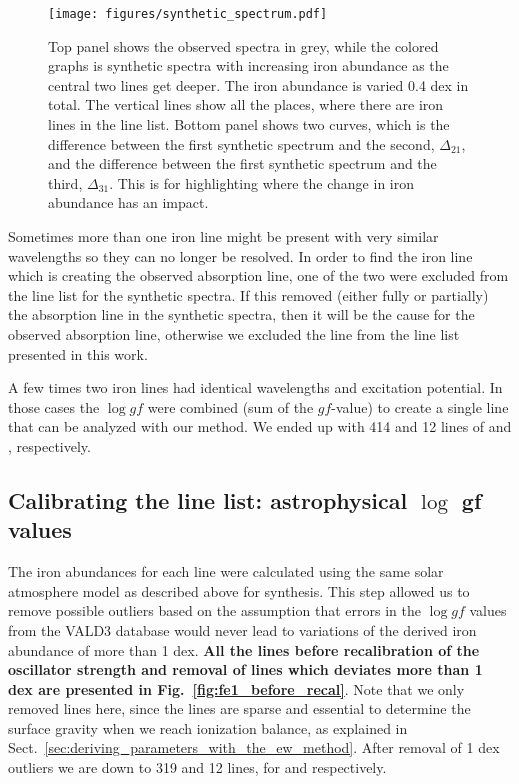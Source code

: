 \documentclass{aa}
\begin{document}
\begin{figure}[tpb]
    \centering
    \texttt{[image: figures/synthetic\_spectrum.pdf]}
    \caption{Top panel shows the observed spectra in grey, while the
    colored graphs is synthetic spectra with increasing iron abundance
    as the central two lines get deeper. The iron abundance is varied
    0.4 dex in total. The vertical lines show all the places, where there are
    iron lines in the line list. Bottom panel shows two curves, which is
    the difference between the first synthetic spectrum and the second,
    $\Delta_{21}$, and the difference between the first synthetic
    spectrum and the third, $\Delta_{31}$. This is for highlighting
    where the change in iron abundance has an impact.}
    \label{fig:synthesis}
\end{figure}


Sometimes more than one iron line might be present with very similar
wavelengths so they can no longer be resolved. In order to find the
iron line which is creating the observed absorption line, one of the
two were excluded from the line list for the synthetic spectra. If this
removed (either fully or partially) the absorption line in the synthetic
spectra, then it will be the cause for the observed absorption line,
otherwise we excluded the line from the line list presented in this
work.

A few times two iron lines had identical wavelengths and excitation
potential. In those cases the $\log \mathit{gf}$ were combined (sum of
the $\mathit{gf}$-value) to create a single line that can be analyzed
with our method. We ended up with 414 and 12 lines of  and
, respectively.


\subsection{Calibrating the line list: astrophysical $\log$ gf values}
\label{ssub:Recalibrating-the-atomic-data}

The iron abundances for each line were calculated using the same
solar atmosphere model as described above for synthesis. This step
allowed us to remove possible outliers based on the assumption that
errors in the $\log \mathit{gf}$ values from the VALD3 database
would never lead to variations of the derived iron abundance of more
than 1 dex. \textbf{All the  lines before recalibration of
the oscillator strength and removal of lines which deviates more than
1 dex are presented in Fig.~\ref{fig:fe1_before_recal}}.
Note that we only removed  lines here, since
the  lines are sparse and essential to determine the
surface gravity when we reach ionization balance, as explained in
Sect.~\ref{sec:deriving_parameters_with_the_ew_method}. After removal
of 1 dex outliers we are down to 319 and 12 lines, for  and
 respectively.
\end{document}
